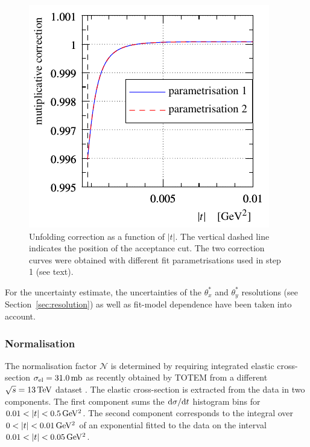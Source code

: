 \begin{figure}
\begin{center}
\includegraphics{fig/unfolding_num_int_model_cmp.pdf}
\caption{%
Unfolding correction as a function of $|t|$. The vertical dashed line indicates the position of the acceptance cut. The two correction curves were obtained with different fit parametrisations used in step 1 (see text).
}
\label{fig:unfolding}
\end{center}
\end{figure}

For the uncertainty estimate, the uncertainties of the $\theta_x^*$ and $\theta_y^*$ resolutions (see Section~\ref{sec:resolution}) as well as fit-model dependence have been taken into account.




\subsubsection{Normalisation}
\label{sec:normalisation}

The normalisation factor $\mathcal{N}$ is determined by requiring integrated elastic cross-section $\sigma_{\rm el} = 31.0\,{\rm mb}$ as recently obtained by TOTEM from a different $\sqrt s = 13\,{\rm TeV}$ dataset \cite{totem-13tev-90m}. The elastic cross-section is extracted from the data in two components. The first component sums the ${\rm d}\sigma/{\rm d} t$ histogram bins for $0.01 < |t| < 0.5\,{\rm GeV^2}$. The second component corresponds to the integral over $0 < |t| < 0.01\,{\rm GeV^2}$ of an exponential fitted to the data on the interval $0.01 < |t| < 0.05\,{\rm GeV^2}$.


